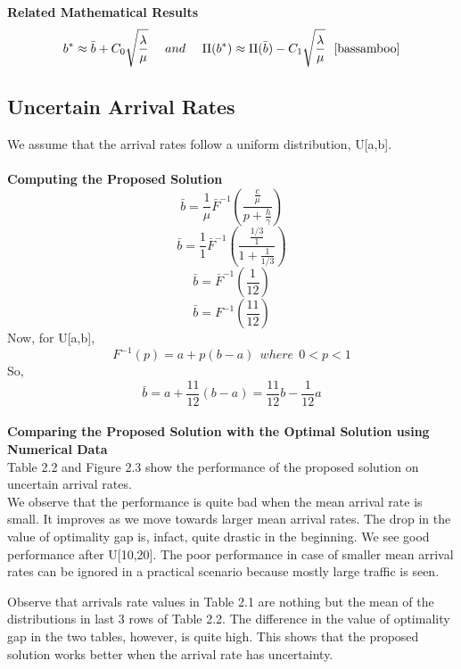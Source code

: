 \textbf{Related Mathematical Results}\\
\[b^* \approx \bar{b} + C_0\sqrt{\frac{\lambda}{\mu}} \ \ \ \ and \ \ \ \ \Pi(b^*) \approx \Pi(\bar{b}) -  C_1\sqrt{\frac{\lambda}{\mu}}  \ \ \cite{bassamboo}\]

\subsection{Uncertain Arrival Rates}
We assume that the arrival rates follow a uniform distribution, U[a,b]. \\ \\
\textbf{Computing the Proposed Solution} \\
\[\bar{b}=\frac{1}{\mu}\bar{F}^{-1}(\frac{\frac{c}{\mu}}{p + \frac{h}{\gamma}})\]
\[\bar{b}=\frac{1}{1}\bar{F}^{-1}(\frac{\frac{1/3}{1}}{1 + \frac{1}{1/3}})\]
\[\bar{b}=\bar{F}^{-1}(\frac{1}{12})\]
\[\bar{b}=F^{-1}(\frac{11}{12})\]
Now, for U[a,b],
\[F^{-1}(p) = a + p(b-a) \ \ where \ \ 0<p<1\]
So,
\[\bar{b}=a+\frac{11}{12}(b-a)=\frac{11}{12}b-\frac{1}{12}a\] \\
\textbf{Comparing the Proposed Solution with the Optimal Solution using Numerical Data} \\
Table 2.2 and Figure 2.3 show the performance of the proposed solution on uncertain arrival rates. \\
We observe that the performance is quite bad when the mean arrival rate is small. It improves as we move towards larger mean arrival rates. The drop in the value of optimality gap is, infact, quite drastic in the beginning. We see good performance after U[10,20]. The poor performance in case of smaller mean arrival rates can be ignored in a practical scenario because mostly large traffic is seen.
\begin{remark}
Observe that arrivals rate values in Table 2.1 are nothing but the mean of the distributions in last 3 rows of Table 2.2. The difference in the value of optimality gap in the two tables, however, is quite high. This shows that the proposed solution works better when the arrival rate has uncertainty.
\end{remark}
